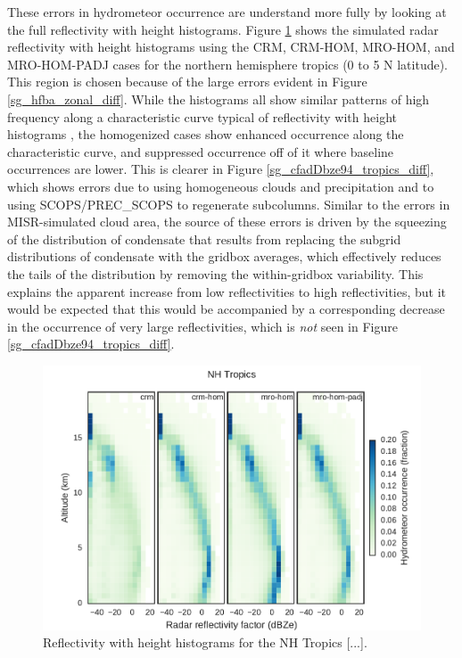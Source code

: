 These errors in hydrometeor occurrence are understand more fully by looking at the full reflectivity with height histograms. Figure \ref{sg_cfadDbze94_tropics} shows the simulated radar reflectivity with height histograms using the CRM, CRM-HOM, MRO-HOM, and MRO-HOM-PADJ cases for the northern hemisphere tropics (0 to 5 N latitude). This region is chosen because of the large errors evident in Figure \ref{sg_hfba_zonal_diff}. While the histograms all show similar patterns of high frequency along a characteristic curve typical of reflectivity with height histograms \citep[e.g.,][]{marchand_et_al_2009}, the homogenized cases show enhanced occurrence along the characteristic curve, and suppressed occurrence off of it where baseline occurrences are lower. This is clearer in Figure \ref{sg_cfadDbze94_tropics_diff}, which shows errors due to using homogeneous clouds and precipitation and to using SCOPS/PREC\_SCOPS to regenerate subcolumns. Similar to the errors in MISR-simulated cloud area, the source of these errors is driven by the squeezing of the distribution of condensate that results from replacing the subgrid distributions of condensate with the gridbox averages, which effectively reduces the tails of the distribution by removing the within-gridbox variability. This explains the apparent increase from low reflectivities to high reflectivities, but it would be expected that this would be accompanied by a corresponding decrease in the occurrence of very large reflectivities, which is \emph{not} seen in Figure \ref{sg_cfadDbze94_tropics_diff}. 
 
\begin{figure}
\centering
\includegraphics[width=\columnwidth]{graphics/subgrid1_cfadDbze94_NHTropics.pdf}
\caption{Reflectivity with height histograms for the NH Tropics [...].}
\label{sg_cfadDbze94_tropics}
\end{figure}

